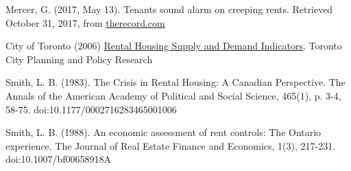\begin{thebibliography}{9}
  Mercer, G. (2017, May 13). Tenants sound alarm on creeping rents. Retrieved October 31, 2017, from \href{https://www.therecord.com/news-story/7312772-tenants-sound-alarm-on-creeping-rents/}{therecord.com}

  City of Toronto (2006) \href{https://www1.toronto.ca/city_of_toronto/social_development_finance__administration/files/pdf/housing_rental.pdf}{Rental Housing Supply and Demand Indicators}. Toronto City Planning and Policy Research

 Smith, L. B. (1983). The Crisis in Rental Housing: A Canadian Perspective. The Annals of the American Academy of Political and Social Science, 465(1), p. 3-4, 58-75. doi:10.1177/0002716283465001006

  Smith, L. B. (1988). An economic assessment of rent controls: The Ontario experience. The Journal of Real Estate Finance and Economics, 1(3), 217-231. doi:10.1007/bf00658918A



\end{thebibliography}

